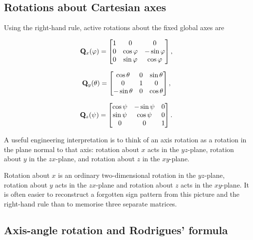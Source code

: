 \subsection{Rotations about Cartesian axes}

Using the right-hand rule, active rotations about the fixed global axes are

\begin{equation}
\mathbf{Q}_x(\varphi)=
\begin{bmatrix}
1&0&0\\
0&\cos\varphi&-\sin\varphi\\
0&\sin\varphi& \cos\varphi
\end{bmatrix},
\end{equation}

\begin{equation}
\mathbf{Q}_y(\theta)=
\begin{bmatrix}
 \cos\theta&0&\sin\theta\\
 0&1&0\\
-\sin\theta&0&\cos\theta
\end{bmatrix},
\end{equation}

\begin{equation}
\mathbf{Q}_z(\psi)=
\begin{bmatrix}
\cos\psi&-\sin\psi&0\\
\sin\psi& \cos\psi&0\\
0&0&1
\end{bmatrix}.
\end{equation}

A useful engineering interpretation is to think of an axis rotation as a
rotation in the plane normal to that axis: rotation about $x$ acts in the
$yz$-plane, rotation about $y$ in the $zx$-plane, and rotation about $z$ in the
$xy$-plane.

\begin{notebooknote}
Rotation about $x$ is an ordinary two-dimensional rotation in the
$yz$-plane, rotation about $y$ acts in the $zx$-plane and rotation about $z$
acts in the $xy$-plane. It is often easier to reconstruct a forgotten sign
pattern from this picture and the right-hand rule than to memorise three
separate matrices.
\end{notebooknote}

\subsection{Axis-angle rotation and Rodrigues' formula}

